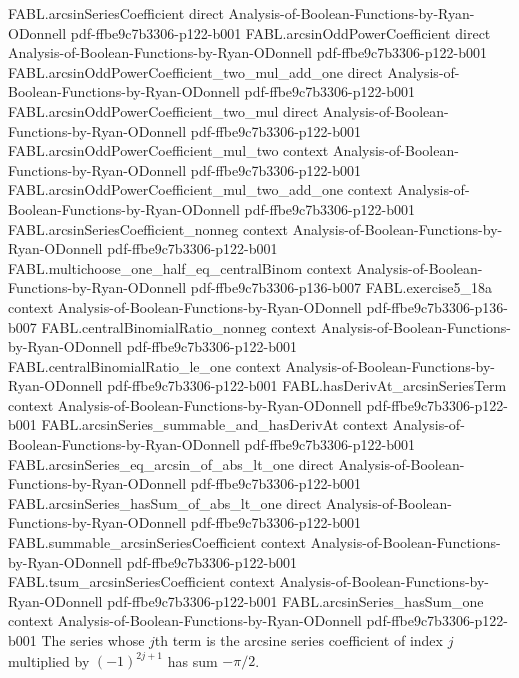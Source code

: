 \begin{lemma}
\label{FABL.arcsinSeries_hasSum_neg_one}
\leanok
{}
\proofstep
  {FABL.arcsinSeriesCoefficient}
  {direct}
  {Analysis-of-Boolean-Functions-by-Ryan-ODonnell}
  {pdf-ffbe9c7b3306-p122-b001}
\proofstep
  {FABL.arcsinOddPowerCoefficient}
  {direct}
  {Analysis-of-Boolean-Functions-by-Ryan-ODonnell}
  {pdf-ffbe9c7b3306-p122-b001}
\proofstep
  {FABL.arcsinOddPowerCoefficient_two_mul_add_one}
  {direct}
  {Analysis-of-Boolean-Functions-by-Ryan-ODonnell}
  {pdf-ffbe9c7b3306-p122-b001}
\proofstep
  {FABL.arcsinOddPowerCoefficient_two_mul}
  {direct}
  {Analysis-of-Boolean-Functions-by-Ryan-ODonnell}
  {pdf-ffbe9c7b3306-p122-b001}
\proofstep
  {FABL.arcsinOddPowerCoefficient_mul_two}
  {context}
  {Analysis-of-Boolean-Functions-by-Ryan-ODonnell}
  {pdf-ffbe9c7b3306-p122-b001}
\proofstep
  {FABL.arcsinOddPowerCoefficient_mul_two_add_one}
  {context}
  {Analysis-of-Boolean-Functions-by-Ryan-ODonnell}
  {pdf-ffbe9c7b3306-p122-b001}
\proofstep
  {FABL.arcsinSeriesCoefficient_nonneg}
  {context}
  {Analysis-of-Boolean-Functions-by-Ryan-ODonnell}
  {pdf-ffbe9c7b3306-p122-b001}
\proofstep
  {FABL.multichoose_one_half_eq_centralBinom}
  {context}
  {Analysis-of-Boolean-Functions-by-Ryan-ODonnell}
  {pdf-ffbe9c7b3306-p136-b007}
\proofstep
  {FABL.exercise5_18a}
  {context}
  {Analysis-of-Boolean-Functions-by-Ryan-ODonnell}
  {pdf-ffbe9c7b3306-p136-b007}
\proofstep
  {FABL.centralBinomialRatio_nonneg}
  {context}
  {Analysis-of-Boolean-Functions-by-Ryan-ODonnell}
  {pdf-ffbe9c7b3306-p122-b001}
\proofstep
  {FABL.centralBinomialRatio_le_one}
  {context}
  {Analysis-of-Boolean-Functions-by-Ryan-ODonnell}
  {pdf-ffbe9c7b3306-p122-b001}
\proofstep
  {FABL.hasDerivAt_arcsinSeriesTerm}
  {context}
  {Analysis-of-Boolean-Functions-by-Ryan-ODonnell}
  {pdf-ffbe9c7b3306-p122-b001}
\proofstep
  {FABL.arcsinSeries_summable_and_hasDerivAt}
  {context}
  {Analysis-of-Boolean-Functions-by-Ryan-ODonnell}
  {pdf-ffbe9c7b3306-p122-b001}
\proofstep
  {FABL.arcsinSeries_eq_arcsin_of_abs_lt_one}
  {direct}
  {Analysis-of-Boolean-Functions-by-Ryan-ODonnell}
  {pdf-ffbe9c7b3306-p122-b001}
\proofstep
  {FABL.arcsinSeries_hasSum_of_abs_lt_one}
  {direct}
  {Analysis-of-Boolean-Functions-by-Ryan-ODonnell}
  {pdf-ffbe9c7b3306-p122-b001}
\proofstep
  {FABL.summable_arcsinSeriesCoefficient}
  {context}
  {Analysis-of-Boolean-Functions-by-Ryan-ODonnell}
  {pdf-ffbe9c7b3306-p122-b001}
\proofstep
  {FABL.tsum_arcsinSeriesCoefficient}
  {context}
  {Analysis-of-Boolean-Functions-by-Ryan-ODonnell}
  {pdf-ffbe9c7b3306-p122-b001}
\proofstep
  {FABL.arcsinSeries_hasSum_one}
  {context}
  {Analysis-of-Boolean-Functions-by-Ryan-ODonnell}
  {pdf-ffbe9c7b3306-p122-b001}
The series whose $j$th term is the arcsine series coefficient of index $j$ multiplied by
$(-1)^{2j+1}$ has sum $-\pi/2$.
\end{lemma}

